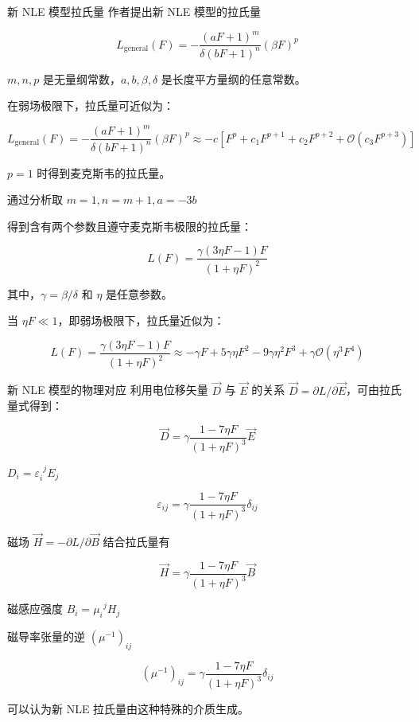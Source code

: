 \documentclass[9pt, dvipsnames]{beamer} %
\begin{document}
\begin{frame}{新 NLE 模型拉氏量}
作者提出新 NLE 模型的拉氏量

$$
L_{\mathrm{general}}(F)
=-\frac{\left(aF+1 \right)^m }{\delta(bF+1)^n } \left(\beta F \right)^p
$$

$m,n,p $ 是无量纲常数，$a,b,\beta,\delta $ 是长度平方量纲的任意常数。

在弱场极限下，拉氏量可近似为：

$$
L_{\mathrm{general}}(F)
=-\frac{\left(aF+1 \right)^m }{\delta(bF+1)^n } \left(\beta F \right)^p
\approx -c\left[F^p + c_1 F^{p+1} +c_2 F^{p+2}  + \mathcal{O}\left(c_3 F^{p+3} \right) \right]
$$

$p=1 $ 时得到麦克斯韦的拉氏量。

通过分析取 $m=1,n=m+1,a=-3b $

得到含有两个参数且遵守麦克斯韦极限的拉氏量：

$$
L(F)
=\frac{\gamma(3\eta F - 1 )F }{(1+\eta F)^2 }
$$

其中，$\gamma=\beta/\delta $ 和 $\eta $ 是任意参数。

当 $\eta F\ll 1 $，即弱场极限下，拉氏量近似为：

$$
L(F)
=\frac{\gamma(3\eta F - 1 )F }{(1+\eta F)^2 } 
\approx -\gamma F + 5\gamma \eta F^2 -9\gamma \eta^2 F^3 + \gamma\mathcal{O}\left(\eta^3F^4 \right) 
$$
\end{frame}

\begin{frame}{新 NLE 模型的物理对应}
利用电位移矢量 $\vec{D} $ 与 $\vec{E} $ 的关系 $\vec{D}=\partial L/\partial \vec{E} $，可由拉氏量式得到：

$$
\vec{D}
=\gamma\frac{1-7\eta F }{(1+\eta F)^3 } \vec{E}
$$

$D_i = \varepsilon_i^{~~ j } E_j $

$$
\varepsilon_{ij} = \gamma \frac{1-7\eta F }{(1+\eta F)^3 }\delta_{ij} 
$$

磁场 $\vec{H}=-\partial L/\partial \vec{B} $ 结合拉氏量有

$$
\vec{H}
=\gamma \frac{1-7\eta F }{(1+\eta F)^3 } \vec{B}
$$

磁感应强度 $B_i=\mu_i^{~~j}H_j $

磁导率张量的逆 $\left(\mu^{-1} \right)_{ij} $

$$
\left(\mu^{-1} \right)_{ij}
=\gamma \frac{1-7\eta F }{(1+\eta F)^3 } \delta_{ij}
$$

可以认为新 NLE 拉氏量由这种特殊的介质生成。
\end{frame}
\end{document}
